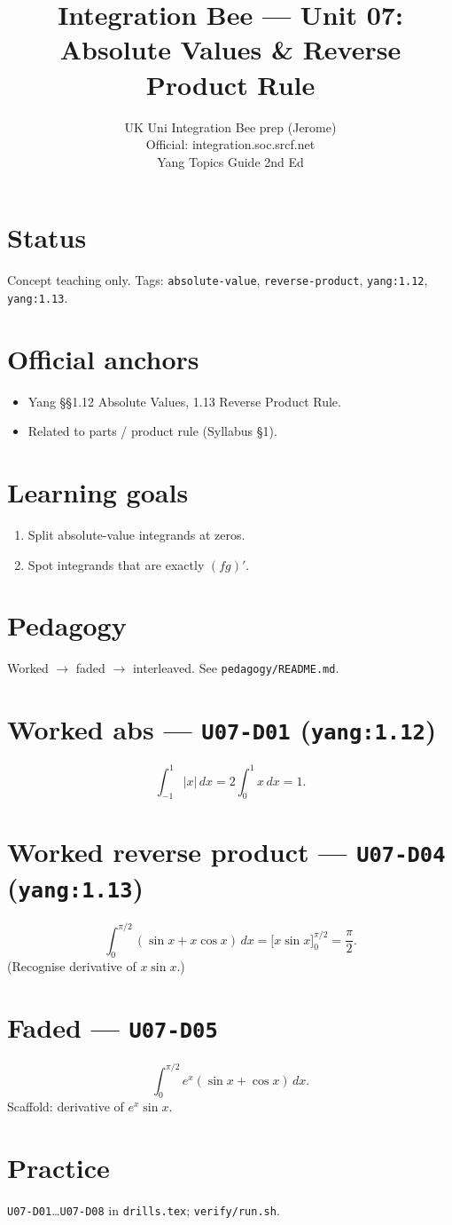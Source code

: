 
\title{Integration Bee --- Unit 07:\\ Absolute Values \& Reverse Product Rule}
\author{UK Uni Integration Bee prep (Jerome)\\ Official: integration.soc.srcf.net\\ Yang Topics Guide 2nd Ed}
\date{}

\maketitle
\section*{Status}
Concept teaching only. Tags: \texttt{absolute-value}, \texttt{reverse-product}, \texttt{yang:1.12}, \texttt{yang:1.13}.
\section{Official anchors}
\begin{itemize}
  \item Yang §§1.12 Absolute Values, 1.13 Reverse Product Rule.
  \item Related to parts / product rule (Syllabus §1).
\end{itemize}
\section{Learning goals}
\begin{enumerate}
  \item Split absolute-value integrands at zeros.
  \item Spot integrands that are exactly $(fg)'$.
\end{enumerate}
\section{Pedagogy}
Worked $\to$ faded $\to$ interleaved. See \texttt{pedagogy/README.md}.

\section{Worked abs --- \texttt{U07-D01} (\texttt{yang:1.12})}
\[
\int_{-1}^{1}|x|\,dx = 2\int_0^1 x\,dx = 1.
\]

\section{Worked reverse product --- \texttt{U07-D04} (\texttt{yang:1.13})}
\[
\int_0^{\pi/2}(\sin x + x\cos x)\,dx = \big[x\sin x\big]_0^{\pi/2}=\frac\pi2.
\]
(Recognise derivative of $x\sin x$.)

\section{Faded --- \texttt{U07-D05}}
\[
\int_0^{\pi/2} e^x(\sin x+\cos x)\,dx.
\]
Scaffold: derivative of $e^x\sin x$.

\section{Practice}
\texttt{U07-D01}\ldots\texttt{U07-D08} in \texttt{drills.tex}; \texttt{verify/run.sh}.

